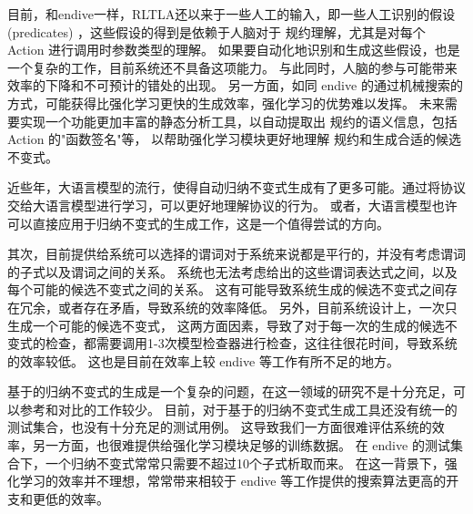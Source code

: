 目前，和endive一样，RLTLA还以来于一些人工的输入，即一些人工识别的假设(predicates)
，这些假设的得到是依赖于人脑对于 \TLA 规约理解，尤其是对每个 Action 进行调用时参数类型的理解。
如果要自动化地识别和生成这些假设，也是一个复杂的工作，目前系统还不具备这项能力。
与此同时，人脑的参与可能带来效率的下降和不可预计的错处的出现。
另一方面，如同 endive 的通过机械搜索的方式，可能获得比强化学习更快的生成效率，强化学习的优势难以发挥。
未来需要实现一个功能更加丰富的静态分析工具，以自动提取出 \TLA 规约的语义信息，包括 Action 的"函数签名"等，
以帮助强化学习模块更好地理解 \TLA 规约和生成合适的候选不变式。

近些年，大语言模型的流行，使得自动归纳不变式生成有了更多可能。通过将协议交给大语言模型进行学习，可以更好地理解协议的行为。
或者，大语言模型也许可以直接应用于归纳不变式的生成工作，这是一个值得尝试的方向。

其次，目前提供给系统可以选择的谓词对于系统来说都是平行的，并没有考虑谓词的子式以及谓词之间的关系。
系统也无法考虑给出的这些谓词表达式之间，以及每个可能的候选不变式之间的关系。
这有可能导致系统生成的候选不变式之间存在冗余，或者存在矛盾，导致系统的效率降低。
另外，目前系统设计上，一次只生成一个可能的候选不变式，
这两方面因素，导致了对于每一次的生成的候选不变式的检查，都需要调用1-3次模型检查器进行检查，这往往很花时间，导致系统的效率较低。
这也是目前在效率上较 endive 等工作有所不足的地方。

基于\TLA 的归纳不变式的生成是一个复杂的问题，在这一领域的研究不是十分充足，可以参考和对比的工作较少。
目前，对于基于\TLA 的归纳不变式生成工具还没有统一的测试集合，也没有十分充足的测试用例。
这导致我们一方面很难评估系统的效率，另一方面，也很难提供给强化学习模块足够的训练数据。
在 endive 的测试集合下，一个归纳不变式常常只需要不超过10个子式析取而来。
在这一背景下，强化学习的效率并不理想，常常带来相较于 endive 等工作提供的搜索算法更高的开支和更低的效率。

